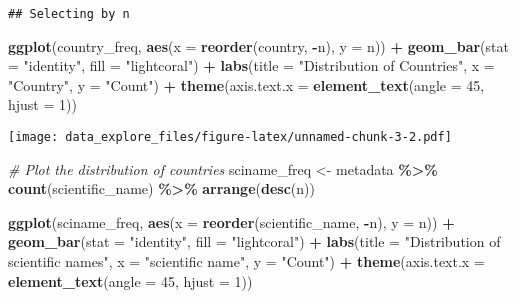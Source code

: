 \documentclass[
]{article}
\newenvironment{Shaded}{\begin{snugshade}}{\end{snugshade}}
\newcommand{\AttributeTok}[1]{\textcolor[rgb]{0.13,0.29,0.53}{#1}}
\newcommand{\CommentTok}[1]{\textcolor[rgb]{0.56,0.35,0.01}{\textit{#1}}}
\newcommand{\DecValTok}[1]{\textcolor[rgb]{0.00,0.00,0.81}{#1}}
\newcommand{\FunctionTok}[1]{\textcolor[rgb]{0.13,0.29,0.53}{\textbf{#1}}}
\newcommand{\NormalTok}[1]{#1}
\newcommand{\OtherTok}[1]{\textcolor[rgb]{0.56,0.35,0.01}{#1}}
\newcommand{\SpecialCharTok}[1]{\textcolor[rgb]{0.81,0.36,0.00}{\textbf{#1}}}
\newcommand{\StringTok}[1]{\textcolor[rgb]{0.31,0.60,0.02}{#1}}
\begin{document}
\begin{verbatim}
## Selecting by n
\end{verbatim}

\begin{Shaded}
\begin{Highlighting}[]
\FunctionTok{ggplot}\NormalTok{(country\_freq, }\FunctionTok{aes}\NormalTok{(}\AttributeTok{x =} \FunctionTok{reorder}\NormalTok{(country, }\SpecialCharTok{{-}}\NormalTok{n), }\AttributeTok{y =}\NormalTok{ n)) }\SpecialCharTok{+}
  \FunctionTok{geom\_bar}\NormalTok{(}\AttributeTok{stat =} \StringTok{"identity"}\NormalTok{, }\AttributeTok{fill =} \StringTok{"lightcoral"}\NormalTok{) }\SpecialCharTok{+}
  \FunctionTok{labs}\NormalTok{(}\AttributeTok{title =} \StringTok{"Distribution of Countries"}\NormalTok{, }\AttributeTok{x =} \StringTok{"Country"}\NormalTok{, }\AttributeTok{y =} \StringTok{"Count"}\NormalTok{) }\SpecialCharTok{+}
  \FunctionTok{theme}\NormalTok{(}\AttributeTok{axis.text.x =} \FunctionTok{element\_text}\NormalTok{(}\AttributeTok{angle =} \DecValTok{45}\NormalTok{, }\AttributeTok{hjust =} \DecValTok{1}\NormalTok{))}
\end{Highlighting}
\end{Shaded}

\texttt{[image: data\_explore\_files/figure-latex/unnamed-chunk-3-2.pdf]}

\begin{Shaded}
\begin{Highlighting}[]
\CommentTok{\# Plot the distribution of countries}
\NormalTok{sciname\_freq }\OtherTok{\textless{}{-}}\NormalTok{ metadata }\SpecialCharTok{\%\textgreater{}\%}
  \FunctionTok{count}\NormalTok{(scientific\_name) }\SpecialCharTok{\%\textgreater{}\%}
  \FunctionTok{arrange}\NormalTok{(}\FunctionTok{desc}\NormalTok{(n))}

\FunctionTok{ggplot}\NormalTok{(sciname\_freq, }\FunctionTok{aes}\NormalTok{(}\AttributeTok{x =} \FunctionTok{reorder}\NormalTok{(scientific\_name, }\SpecialCharTok{{-}}\NormalTok{n), }\AttributeTok{y =}\NormalTok{ n)) }\SpecialCharTok{+}
  \FunctionTok{geom\_bar}\NormalTok{(}\AttributeTok{stat =} \StringTok{"identity"}\NormalTok{, }\AttributeTok{fill =} \StringTok{"lightcoral"}\NormalTok{) }\SpecialCharTok{+}
  \FunctionTok{labs}\NormalTok{(}\AttributeTok{title =} \StringTok{"Distribution of scientific names"}\NormalTok{, }\AttributeTok{x =} \StringTok{"scientific name"}\NormalTok{, }\AttributeTok{y =} \StringTok{"Count"}\NormalTok{) }\SpecialCharTok{+}
  \FunctionTok{theme}\NormalTok{(}\AttributeTok{axis.text.x =} \FunctionTok{element\_text}\NormalTok{(}\AttributeTok{angle =} \DecValTok{45}\NormalTok{, }\AttributeTok{hjust =} \DecValTok{1}\NormalTok{))}
\end{Highlighting}
\end{Shaded}
\end{document}
